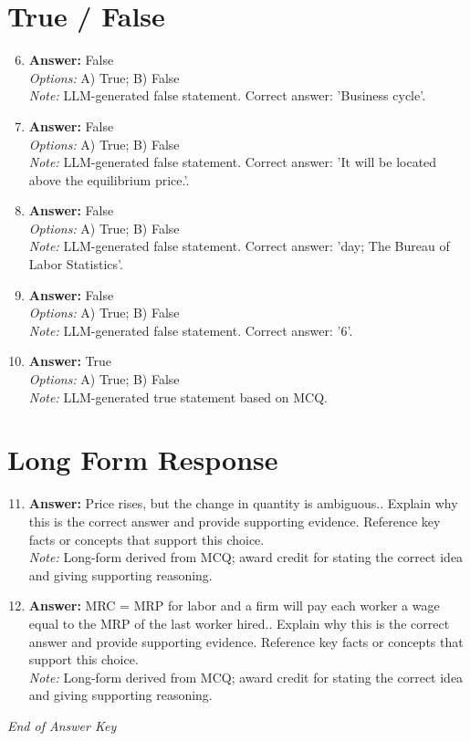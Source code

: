 \documentclass[12pt]{article}
\begin{document}
\section*{True / False}
\begin{enumerate}[label=\arabic*.]
\setcounter{enumi}{5}
\item \textbf{Answer:} False
\\ \textit{Options:} A) True; B) False
\\ \textit{Note:} LLM-generated false statement. Correct answer: 'Business cycle'.
\item \textbf{Answer:} False
\\ \textit{Options:} A) True; B) False
\\ \textit{Note:} LLM-generated false statement. Correct answer: 'It will be located above the equilibrium price.'.
\item \textbf{Answer:} False
\\ \textit{Options:} A) True; B) False
\\ \textit{Note:} LLM-generated false statement. Correct answer: 'day; The Bureau of Labor Statistics'.
\item \textbf{Answer:} False
\\ \textit{Options:} A) True; B) False
\\ \textit{Note:} LLM-generated false statement. Correct answer: '6'.
\item \textbf{Answer:} True
\\ \textit{Options:} A) True; B) False
\\ \textit{Note:} LLM-generated true statement based on MCQ.
\end{enumerate}

\section*{Long Form Response}
\begin{enumerate}[label=\arabic*.]
\setcounter{enumi}{10}
\item \textbf{Answer:} Price rises, but the change in quantity is ambiguous.. Explain why this is the correct answer and provide supporting evidence. Reference key facts or concepts that support this choice.
\\ \textit{Note:} Long-form derived from MCQ; award credit for stating the correct idea and giving supporting reasoning.
\item \textbf{Answer:} MRC = MRP for labor and a firm will pay each worker a wage equal to the MRP of the last worker hired.. Explain why this is the correct answer and provide supporting evidence. Reference key facts or concepts that support this choice.
\\ \textit{Note:} Long-form derived from MCQ; award credit for stating the correct idea and giving supporting reasoning.
\end{enumerate}

\vfill
\noindent\textit{End of Answer Key}
\end{document}
